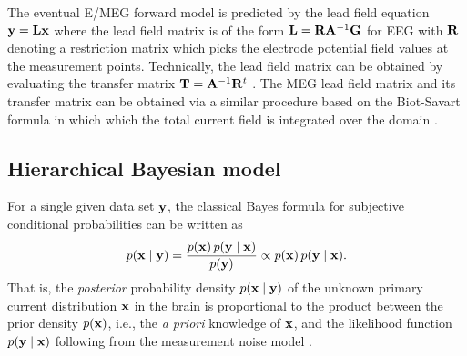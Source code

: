 \documentclass[5p]{elsarticle}
\begin{document}
The eventual E/MEG forward model is predicted by the lead field equation ${\bf y} = {\bf L} {\bf x}$ where the lead field matrix is of the form ${\bf L} = {\bf R} {\bf A}^{-1} {\bf G} $ for EEG with ${\bf R}$ denoting a restriction matrix which picks the electrode potential field values at the measurement points. Technically, the lead field matrix can be obtained by evaluating the transfer matrix ${\bf T} = {\bf A}^{-1} {\bf R}^t$ .  The MEG lead field matrix and its transfer matrix can be obtained via a similar procedure based on the Biot-Savart formula in which which the total current field is integrated over the domain \citep{pursiainen2012,sato2004hierarchical}. 

\subsection{Hierarchical Bayesian model}

For a single given data set ${\bf y}$, the classical Bayes formula for subjective conditional probabilities can be written as
\begin{equation}
p ( {\bf x} \mid {\bf y})  =   \frac{p({\bf x}) \, p({\bf y} \mid {\bf x})} {p({\bf y})} \propto  {p({\bf x}) \, p({\bf y} \mid {\bf x})}.  
\end{equation} 
That is, the {\em posterior} probability density $p({\bf x} \mid {\bf y})$ of the  unknown primary current distribution ${\bf x}$ in the brain is proportional to the product between the prior density $p({\bf x})$, i.e., the {\em a priori} knowledge of ${\bf x}$, and the likelihood function $p({\bf y} \mid {\bf x})$ following from the measurement noise model \cite{schmidt1999bayesian}. 
\end{document}
